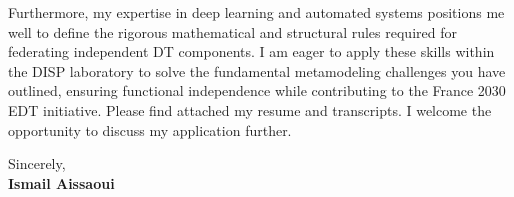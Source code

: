 \documentclass[11pt,a4paper]{article}
\begin{document}
\vspace{0.5em}
\noindent
Furthermore, my expertise in deep learning and automated systems positions me well to define the rigorous mathematical and structural rules required for federating independent DT components. I am eager to apply these skills within the DISP laboratory to solve the fundamental metamodeling challenges you have outlined, ensuring functional independence while contributing to the France 2030 EDT initiative. Please find attached my resume and transcripts. I welcome the opportunity to discuss my application further.

\vspace{1.5em}
\noindent
Sincerely, \\[0.5em]
\textbf{Ismail Aissaoui}
\end{document}
